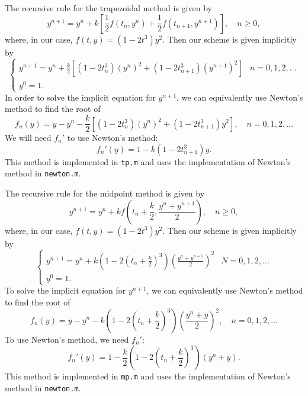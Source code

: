 \documentclass{homework}
\begin{document}
\begin{alphaparts}
		\questionpart The recursive rule for the trapezoidal method is given by
		\begin{equation*}
			y^{n+1} = y^n + k\left[\frac{1}{2}f\left(t_n, y^n\right) + \frac{1}{2}f\left(t_{n+1}, y^{n+1}\right)\right],\quad n \ge 0,
		\end{equation*}
		where, in our case, $f(t,y) = \left(1-2t^3\right)y^2$. Then our scheme is given implicitly by
		\begin{equation*}
			\begin{cases}
				y^{n+1} = y^n + \frac{k}{2}\left[\left(1-2t_n^3\right)\left(y^n\right)^2 + \left(1-2t_{n+1}^3\right)\left(y^{n+1}\right)^2\right] & n = 0,1,2,\dots \\
				y^0 = 1.
			\end{cases}
		\end{equation*}
		In order to solve the implicit equation for $y^{n+1}$, we can equivalently use Newton's method to find the root of
		\begin{equation*}
			f_n(y) = y - y^n - \frac{k}{2}\left[\left(1-2t_n^3\right)\left(y^n\right)^2 + \left(1-2t_{n+1}^3\right)y^2\right], \quad n = 0,1,2,\dots
		\end{equation*}
		We will need $f_n'$ to use Newton's method:
		\begin{equation*}
			f_n'(y) = 1- k(1-2t_{n+1}^3)y.
		\end{equation*}
		This method is implemented in \verb*|tp.m| and uses the implementation of Newton's method in \verb*|newton.m|.
		
		\questionpart The recursive rule for the midpoint method is given by
		\begin{equation*}
			y^{n+1} = y^n + kf\left(t_n + \frac{k}{2}, \frac{y^n + y^{n+1}}{2}\right), \quad n \ge 0,
		\end{equation*}
		where, in our case, $f(t,y) = \left(1-2t^3\right)y^2$. Then our scheme is given implicitly by
		\begin{equation*}
			\begin{cases}
				y^{n+1} = y^n + k\left(1-2\left(t_n + \frac{k}{2}\right)^3\right)\left(\frac{y^n + y^{n+1}}{2}\right)^2 & N = 0,1,2,\dots\\
				y^0 = 1.
			\end{cases}
		\end{equation*}
		To solve the implicit equation for $y^{n+1}$, we can equivalently use Newton's method to find the root of
		\begin{equation*}
			f_n(y) = y - y^n - k\left(1-2\left(t_n + \frac{k}{2}\right)^3\right)\left(\frac{y^n + y}{2}\right)^2, \quad n = 0,1,2,\dots
		\end{equation*}
		To use Newton's method, we need $f_n'$:
		\begin{equation*}
			f_n'(y) = 1 - \frac{k}{2}\left(1-2\left(t_n + \frac{k}{2}\right)^3\right)(y^n + y).
		\end{equation*}
		This method is implemented in \verb*|mp.m| and uses the implementation of Newton's method in \verb*|newton.m|.
		

\end{alphaparts}
\end{document}
